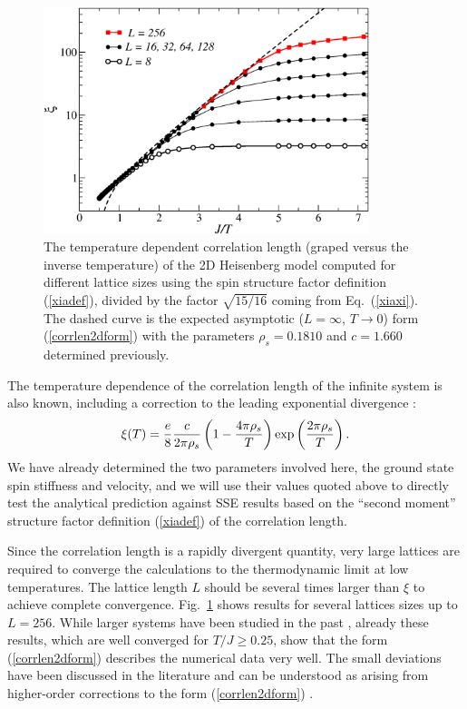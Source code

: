\documentclass[draft,numberedheadings]{aipproc}
\begin{document}
\begin{figure}
\includegraphics[width=9.5cm, clip]{hb2dxi.eps}
\caption{The temperature dependent correlation length (graped versus the inverse temperature) of the 2D Heisenberg model computed for different 
lattice sizes using the spin structure factor definition (\ref{xiadef}), divided by the factor $\sqrt{15/16}$ coming from Eq.~(\ref{xiaxi}). 
The dashed curve is the expected asymptotic ($L=\infty$, $T\to 0$) form (\ref{corrlen2dform}) with the parameters $\rho_s=0.1810$ and $c=1.660$ 
determined previously.}
\label{hb2dxi}
\end{figure}

The temperature dependence of the correlation length of the infinite system is also known, including a correction to the leading exponential
divergence \cite{chn,hasenfratz93}:
\begin{equation}
\xi(T)=\frac{e}{8}\frac{c}{2\pi\rho_s}\left (1 - \frac{4\pi\rho_s}{T} \right ){\rm exp}\left (\frac{2\pi\rho_s}{T} \right ).
\label{corrlen2dform}
\end{equation}
We have already determined the two parameters involved here, the ground state spin stiffness and velocity, and we will use their values quoted 
above to directly test the analytical prediction against SSE results based on the ``second moment'' structure factor definition (\ref{xiadef}) of the 
correlation length.

Since the correlation length is a rapidly divergent quantity, very large lattices are required to converge the calculations to the thermodynamic limit at 
low temperatures. The lattice length $L$ should be several times larger than $\xi$ to achieve complete convergence. Fig.~\ref{hb2dxi} shows results 
for several lattices sizes up to $L=256$. While larger systems have been studied in the past \cite{kim98,beard98}, already these results, which are well 
converged for $T/J \ge 0.25$, show that the form (\ref{corrlen2dform}) describes the numerical data very well. The small deviations have been discussed
in the literature \cite{kim98,beard98} and can be understood as arising from higher-order corrections to the form (\ref{corrlen2dform}) .
\end{document}

